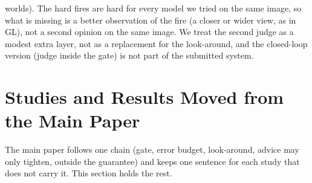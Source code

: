 \documentclass[conference]{IEEEtran}
\begin{document}
worlds). The hard fires are hard for every model we tried on the same image, so what is missing is a better observation of the fire (a closer or wider view, as in GL), not a second opinion on the same image. We treat the second judge as a modest extra layer, not as a replacement for the look-around, and the closed-loop version (judge inside the gate) is not part of the submitted system.

\section{Studies and Results Moved from the Main Paper}\label{app:moved}
The main paper follows one chain (gate, error budget, look-around, advice may only tighten, outside the guarantee) and keeps one sentence for each study that does not carry it. This section holds the rest.
\end{document}
